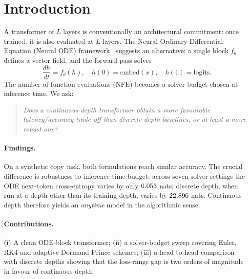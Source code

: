 \section{Introduction}
A transformer of $L$ layers is conventionally an architectural commitment:
once trained, it is also evaluated at $L$ layers. The Neural Ordinary
Differential Equation (Neural ODE) framework~\cite{chen2018node} suggests
an alternative: a single block $f_\theta$ defines a vector field, and the
forward pass solves
\begin{equation}
\frac{dh}{dt}=f_\theta(h),\quad h(0)=\text{embed}(x),\quad h(1)=\text{logits}.
\end{equation}
The number of function evaluations (NFE) becomes a solver budget chosen at
inference time. We ask:
\begin{quote}\emph{Does a continuous-depth transformer obtain a more
favourable latency/accuracy trade-off than discrete-depth baselines, or
at least a more robust one?}\end{quote}

\paragraph{Findings.} On a synthetic copy task, both formulations reach
similar accuracy. The crucial difference is robustness to inference-time
budget: across seven solver settings the ODE next-token cross-entropy
varies by only $0.053$ nats; discrete depth, when run at a depth
other than its training depth, varies by $22.896$ nats.
Continuous depth therefore yields an \emph{anytime} model in the
algorithmic sense.

\paragraph{Contributions.} (i) A clean ODE-block transformer; (ii) a
solver-budget sweep covering Euler, RK4 and adaptive Dormand-Prince
schemes; (iii) a head-to-head comparison with discrete depths showing
that the loss-range gap is two orders of magnitude in favour of
continuous depth.
